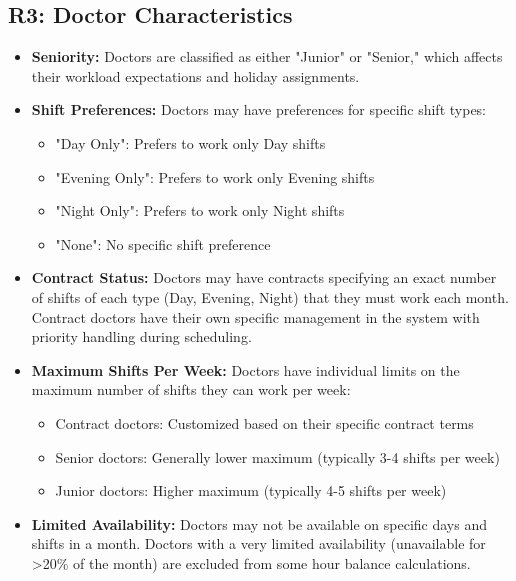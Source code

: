 \documentclass[12pt]{article}
\begin{document}
\subsection*{R3: Doctor Characteristics}

\begin{itemize}
    \item \textbf{Seniority:} Doctors are classified as either "Junior" or "Senior," which affects their workload expectations and holiday assignments.
    
    \item \textbf{Shift Preferences:} Doctors may have preferences for specific shift types:
    \begin{itemize}
        \item "Day Only": Prefers to work only Day shifts
        \item "Evening Only": Prefers to work only Evening shifts
        \item "Night Only": Prefers to work only Night shifts
        \item "None": No specific shift preference
    \end{itemize}
    
    \item \textbf{Contract Status:} Doctors may have contracts specifying an exact number of shifts of each type (Day, Evening, Night) that they must work each month. Contract doctors have their own specific management in the system with priority handling during scheduling.
    
    \item \textbf{Maximum Shifts Per Week:} Doctors have individual limits on the maximum number of shifts they can work per week:
    \begin{itemize}
        \item Contract doctors: Customized based on their specific contract terms
        \item Senior doctors: Generally lower maximum (typically 3-4 shifts per week)
        \item Junior doctors: Higher maximum (typically 4-5 shifts per week)
    \end{itemize}
    
    \item \textbf{Limited Availability:} Doctors may not be available on specific days and shifts in a month. Doctors with a very limited availability (unavailable for >20\% of the month) are excluded from some hour balance calculations.
\end{itemize}
\end{document}
